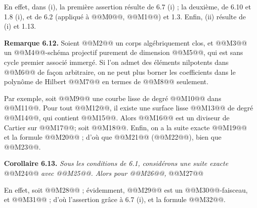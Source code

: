 
En effet, dans (i), la premi\`ere assertion r\'esulte de 6.7 (i) ; la deuxi\`eme, de 6.10 et 1.8 (i), et de 6.2 (appliqu\'e \`a @@M0@@, @@M1@@) et 1.3. Enfin, (ii) r\'esulte de (i) et 1.13.

\textbf{Remarque 6.12.} Soient @@M2@@ un corps alg\'ebriquement clos, et @@M3@@ un @@M4@@-sch\'ema projectif purement de dimension @@M5@@, qui est sans cycle premier associ\'e immerg\'e. Si l'on admet des \'el\'ements nilpotents dans @@M6@@ de fa\c{c}on arbitraire, on ne peut plus borner les coefficients dans le polyn\^ome de Hilbert @@M7@@ en termes de @@M8@@ seulement.

Par exemple, soit @@M9@@ une courbe lisse de degr\'e @@M10@@ dans @@M11@@. Pour tout @@M12@@, il existe une surface lisse @@M13@@ de degr\'e @@M14@@, qui contient @@M15@@. Alors @@M16@@ est un diviseur de Cartier sur @@M17@@; soit @@M18@@. Enfin, on a la suite exacte @@M19@@ et la formule @@M20@@ ; d'o\`u que @@M21@@ (@@M22@@), bien que @@M23@@.

\textbf{Corollaire 6.13.} \emph{Sous les conditions de 6.1, consid\'erons une suite exacte}
@@M24@@
\emph{avec @@M25@@. Alors pour @@M26@@,}
@@M27@@

En effet, soit @@M28@@ ; \'evidemment, @@M29@@ est un @@M30@@-faisceau, et @@M31@@ ; d'o\`u l'assertion gr\^ace \`a 6.7 (i), et la formule @@M32@@.

